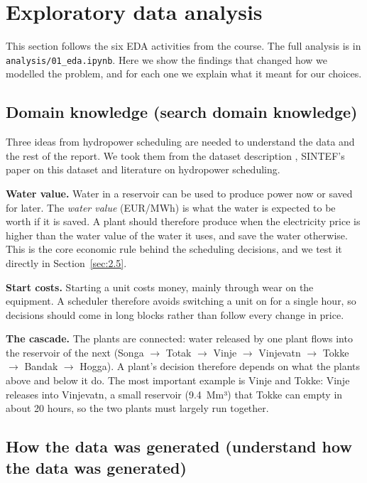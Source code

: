 \section{Exploratory data analysis}\label{sec:2}

This section follows the six EDA activities from the course. The full analysis is in \texttt{analysis/01\_eda.ipynb}. Here we show the findings that changed how we modelled the problem, and for each one we explain what it meant for our choices.

\subsection{Domain knowledge (search domain knowledge)}\label{sec:2.1}

Three ideas from hydropower scheduling are needed to understand the data and the rest of the report. We took them from the dataset description \citep{sintef2026dataset}, SINTEF's paper on this dataset \citep{barjaktarevic2026} and literature on hydropower scheduling.

\textbf{Water value.} Water in a reservoir can be used to produce power now or saved for later. The \emph{water value} (EUR/MWh) is what the water is expected to be worth if it is saved. A plant should therefore produce when the electricity price is higher than the water value of the water it uses, and save the water otherwise. This is the core economic rule behind the scheduling decisions, and we test it directly in Section~\ref{sec:2.5}.

\textbf{Start costs.} Starting a unit costs money, mainly through wear on the equipment. A scheduler therefore avoids switching a unit on for a single hour, so decisions should come in long blocks rather than follow every change in price.

\textbf{The cascade.} The plants are connected: water released by one plant flows into the reservoir of the next (Songa $\rightarrow$ Totak $\rightarrow$ Vinje $\rightarrow$ Vinjevatn $\rightarrow$ Tokke $\rightarrow$ Bandak $\rightarrow$ Hogga). A plant's decision therefore depends on what the plants above and below it do. The most important example is Vinje and Tokke: Vinje releases into Vinjevatn, a small reservoir (9.4~Mm³) that Tokke can empty in about 20 hours, so the two plants must largely run together.

\subsection{How the data was generated (understand how the data was generated)}\label{sec:2.2}


